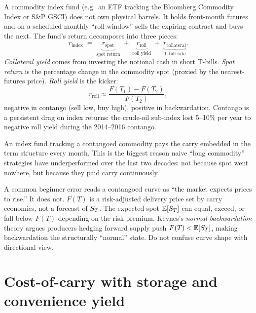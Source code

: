 A commodity index fund (e.g.\ an ETF tracking the Bloomberg
Commodity Index or S\&P GSCI) does not own physical barrels.  It
holds front-month futures and on a scheduled monthly ``roll window''
sells the expiring contract and buys the next.  The fund's return
decomposes into three pieces:
\[
  r_{\text{index}} \;=\; \underbrace{r_{\text{spot}}}_{\text{spot return}}
    \;+\; \underbrace{r_{\text{roll}}}_{\text{roll yield}}
    \;+\; \underbrace{r_{\text{collateral}}}_{\text{T-bill rate}}.
\]
\emph{Collateral yield} comes from investing the notional cash in
short T-bills.  \emph{Spot return} is the percentage change in the
commodity spot (proxied by the nearest-futures price).  \emph{Roll
yield} is the kicker:
\[
  r_{\text{roll}} \approx \frac{F(T_1) - F(T_2)}{F(T_2)},
\]
negative in contango (sell low, buy high), positive in
backwardation.  Contango is a persistent drag on index returns: the
crude-oil sub-index lost 5--10\% per year to negative roll yield
during the 2014--2016 contango.

\begin{intuitionbox}
An index fund tracking a contangoed commodity pays the carry
embedded in the term structure every month.  This is the biggest
reason naive ``long commodity'' strategies have underperformed over
the last two decades: not because spot went nowhere, but because
they paid carry continuously.
\end{intuitionbox}

\begin{pitfallbox}
A common beginner error reads a contangoed curve as ``the market
expects prices to rise.''  It does not.  $F(T)$ is a risk-adjusted
delivery price set by carry economics, not a forecast of $S_T$.
The expected spot $\mathbb{E}[S_T]$ can equal, exceed, or fall below $F(T)$
depending on the risk premium.  Keynes's \emph{normal backwardation}
theory argues producers hedging forward supply push
$F(T) < \mathbb{E}[S_T]$, making backwardation the structurally ``normal''
state.  Do not confuse curve shape with directional view.
\end{pitfallbox}


\section{Cost-of-carry with storage and convenience yield}
\label{sec:cost_of_carry_commodities}

